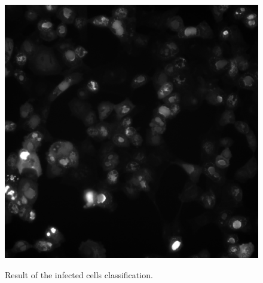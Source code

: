 \documentclass{article}
\begin{document}
\begin{figure}[h!]
\begin{center}
{      \includegraphics[scale=0.07]{Figures/viro_canal1.png}
      \label{textures res}
    }
     \end{center}
\caption{Result of the infected cells classification. \label{fig:infected}}
\end{figure}
\end{document}
